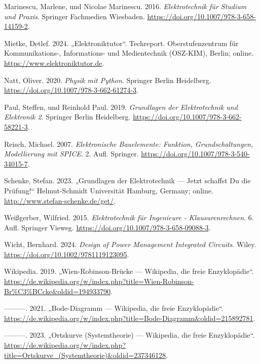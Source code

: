 \documentclass[
  ngerman,
  letterpaper,
]{scrbook}
\newlength{\cslhangindent}
\newenvironment{CSLReferences}[2] %
 {\begin{list}{}{%
  \setlength{\itemindent}{0pt}
  \setlength{\leftmargin}{0pt}
  \setlength{\parsep}{0pt}
  \ifodd #1
   \setlength{\leftmargin}{\cslhangindent}
   \setlength{\itemindent}{-1\cslhangindent}
  \fi
  \setlength{\itemsep}{#2\baselineskip}}}
 {\end{list}}
\begin{document}
\begin{CSLReferences}{1}{0}
Marinescu, Marlene, und Nicolae Marinescu. 2016. \emph{Elektrotechnik
f{ü}r Studium und Praxis}. Springer Fachmedien Wiesbaden.
\url{https://doi.org/10.1007/978-3-658-14159-2}.

Mietke, Detlef. 2024. {„Elektroniktutor``}. Techreport.
Oberstufenzentrum f{ü}r Kommunikations-, Informations- und Medientechnik
(OSZ-KIM), Berlin; online. \url{https://www.elektroniktutor.de}.

Natt, Oliver. 2020. \emph{Physik mit Python}. Springer Berlin
Heidelberg. \url{https://doi.org/10.1007/978-3-662-61274-3}.

Paul, Steffen, und Reinhold Paul. 2019. \emph{Grundlagen der
Elektrotechnik und Elektronik 2}. Springer Berlin Heidelberg.
\url{https://doi.org/10.1007/978-3-662-58221-3}.

Reisch, Michael. 2007. \emph{Elektronische Bauelemente: Funktion,
Grundschaltungen, Modellierung mit SPICE}. 2. Aufl. Springer.
\url{https://doi.org/10.1007/978-3-540-34015-7}.

Schenke, Stefan. 2023. {„{G}rundlagen der {E}lektrotechnik --- {J}etzt
schaffst {D}u die {P}rüfung!``} Helmut-Schmidt Universit{ä}t Hamburg,
Germany; online. \url{http://www.stefan-schenke.de/get/}.

Weißgerber, Wilfried. 2015. \emph{Elektrotechnik f{ü}r Ingenieure -
Klausurenrechnen}. 6. Aufl. Springer Vieweg.
\url{https://doi.org/10.1007/978-3-658-09088-3}.

Wicht, Bernhard. 2024. \emph{Design of Power Management Integrated
Circuits}. Wiley. \url{https://doi.org/10.1002/9781119123095}.

Wikipedia. 2019. {„{W}ien-{R}obinson-{B}rücke --- {W}ikipedia{,} die
freie {E}nzyklopädie``}.
\url{https://de.wikipedia.org/w/index.php?title=Wien-Robinson-Br\%C3\%BCcke&oldid=194933790}.

---------. 2021. {„{B}ode-{D}iagramm --- {W}ikipedia{,} die freie
{E}nzyklopädie``}.
\url{https://de.wikipedia.org/w/index.php?title=Bode-Diagramm&oldid=215892781}.

---------. 2023. {„Ortskurve (Systemtheorie) --- Wikipedia{,} die freie
Enzyklopädie``}.
\url{https://de.wikipedia.org/w/index.php?title=Ortskurve_(Systemtheorie)&oldid=237346128}.


\end{CSLReferences}
\end{document}
